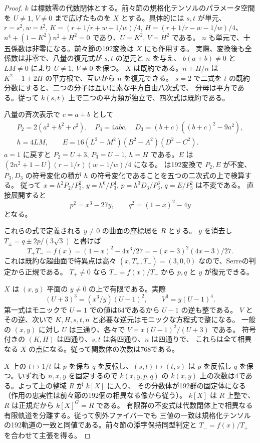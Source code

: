 \begin{proof}
$k$ は標数零の代数閉体とする。前々節の規格化テンソルのパラメータ空間を
$U\ne1$, $V\ne0$ まで広げたものを $X$ とする。具体的には $s,t$ が単元、
$r=s^2,w=t^2$, $K=(r+1/r+w+1/w)/4$, $H=(r+1/r-w-1/w)/4$、
$n^4+(1-K^2)n^2+H^2=0$ であり、$U=K^2$, $V=H^2$ である。
$n$ も単元で、十五係数は非零になる。前々節の192変換は $X$ にも作用する。
実際、変換後も全係数は非零で、八量の復元式が $s,t$ の逆元と $n$ を与え、
$b(a+b)\ne0$ と $LM\ne0$ により $U\ne1$, $V\ne0$ を保つ。
$X$ は既約である。$n\pm H/n$ は $K^2-1\pm2H$ の平方根で、互いから $n$ を復元できる。
$s=2$ で二式を $t$ の既約分数にすると、二つの分子は互いに素な平方自由八次式で、
分母は平方である。従って $k(s,t)$ 上で二つの平方類が独立で、四次式は既約である。

八量の斉次表示で $c=a+b$ として
\[
\begin{gathered}
 P_2=2(a^2+b^2+c^2),\quad P_3=4abc,\quad D_3=(b+c)((b+c)^2-9a^2),\\
 h=4LM,\qquad E=16(L^2-M^2)(B^2-A^2)(D^2-C^2).
\end{gathered}
\]
$a=1$ に戻すと $P_2=U+3$, $P_3=U-1$, $h=H$ である。$E$ は
$(2n^2+1-U)(r-1/r)(w-1/w)/4$ になる。
 は192変換で
$P_2,E$ が不変、$P_3,D_3$ の符号変化の積が $h$ の符号変化であることを五つの二次式の上で検算する。
従って $x=h^2P_2/P_3^2$, $y=h^6/P_3^4$, $p=h^3D_3/P_3^3$, $q=E/P_3^2$ は不変である。
直接展開すると
\[
 p^2=x^3-27y,\qquad q^2=(1-x)^2-4y
\]
となる。

これらの式で定義される $y\ne0$ の曲面の座標環を $R$ とする。
$y$ を消去し $T_{\pm}=q\pm2p/(3\sqrt3)$ と書けば
\[
 T_+T_- = f(x)=(1-x)^2-4x^3/27=-(x-3)^2(4x-3)/27.
\]
これは既約な超曲面で特異点は高々 $(x,T_+,T_-)=(3,0,0)$ なので、Serreの判定から正規である。
$T_+\ne0$ なら $T_-=f(x)/T_+$ から $p,q$ と $y$ が復元できる。

$X$ は $(x,y)$ 平面の $y\ne0$ の上で有限である。実際
\[
 (U+3)^3=(x^3/y)(U-1)^2,\qquad V^3=y(U-1)^4 .
\]
第一式はモニックで $U=1$ での値は64であるから $U-1$ の逆も整である。
$V$ とその逆、次いで $K,H,s,t,n$ と必要な逆元はモニックな方程式で整になる。
一般の $(x,y)$ に対し $U$ は三通り、各々で $V=x(U-1)^2/(U+3)$ である。
符号付きの $(K,H)$ は四通り、$s,t$ は各四通り、$n$ は四通りで、
これらは全て相異なる $X$ の点になる。従って関数体の次数は768である。

$X$ 上の $t\mapsto1/t$ は $p$ を保ち $q$ を反転し、$(s,t)\mapsto(t,s)$ は
$p$ を反転し $q$ を保つ。いずれも $n,x,y$ を固定するので
$k(x,y,p,q)$ の $k(x,y)$ 上の次数は4である。よって上の整域 $R$ が $k[X]$ に入り、
その分数体が192群の固定体になる（作用の忠実性は前々節の192個の相異なる像から従う）。
$k[X]$ は $R$ 上整で、$R$ は正規だから $k[X]^{G}=R$ である。
有限群の不変式は代数閉体上で相異なる有限軌道を分離する。従って例外ファイバーでも
三値の一致は規格化テンソルの192軌道の一致と同値である。前々節の添字保持同型判定と
$T_-=f(x)/T_+$ を合わせて主張を得る。
\end{proof}

